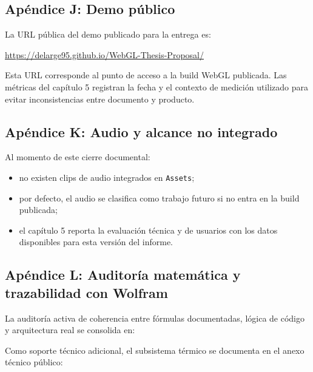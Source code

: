 \subsection*{Apéndice J: Demo público}

La URL pública del demo publicado para la entrega es:
\begin{center}
\url{https://delarge95.github.io/WebGL-Thesis-Proposal/}
\end{center}

\noindent Esta URL corresponde al punto de acceso a la build WebGL publicada. Las métricas del capítulo 5 registran la fecha y el contexto de medición utilizado para evitar inconsistencias entre documento y producto.

\subsection*{Apéndice K: Audio y alcance no integrado}

Al momento de este cierre documental:
\begin{itemize}
    \item no existen clips de audio integrados en \texttt{Assets};
    \item por defecto, el audio se clasifica como trabajo futuro si no entra en la build publicada;
    \item el capítulo 5 reporta la evaluación técnica y de usuarios con los datos disponibles para esta versión del informe.
\end{itemize}

\subsection*{Apéndice L: Auditoría matemática y trazabilidad con Wolfram}

La auditoría activa de coherencia entre fórmulas documentadas, lógica de código y arquitectura real se consolida en:
\begin{center}
\small{}
\end{center}

\noindent Como soporte técnico adicional, el subsistema térmico se documenta en el anexo técnico público:
\begin{center}
\small{}
\end{center}

